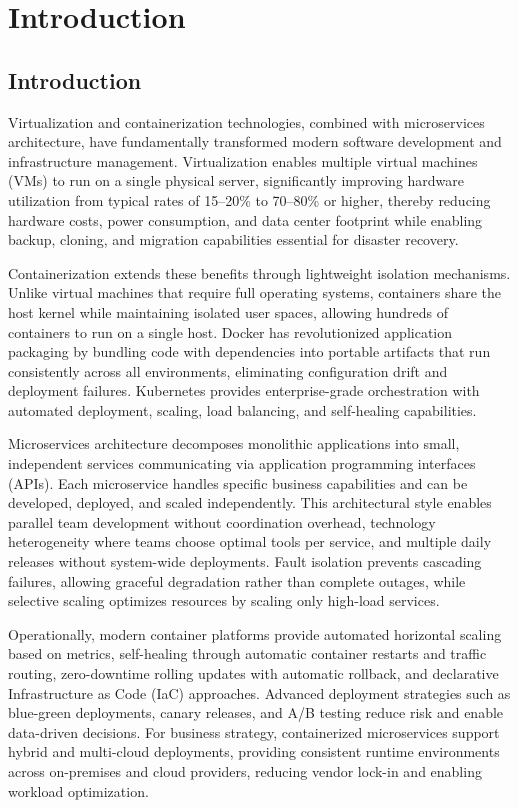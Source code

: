 \documentclass[a4paper, 12pt]{report}
\begin{document}
\chapter{Introduction}

\section{Introduction}

Virtualization and containerization technologies, combined with microservices architecture, have fundamentally transformed modern software development and infrastructure management. Virtualization enables multiple virtual machines (VMs) to run on a single physical server, significantly improving hardware utilization from typical rates of 15–20\% to 70–80\% or higher, thereby reducing hardware costs, power consumption, and data center footprint while enabling backup, cloning, and migration capabilities essential for disaster recovery.

Containerization extends these benefits through lightweight isolation mechanisms. Unlike virtual machines that require full operating systems, containers share the host kernel while maintaining isolated user spaces, allowing hundreds of containers to run on a single host. Docker has revolutionized application packaging by bundling code with dependencies into portable artifacts that run consistently across all environments, eliminating configuration drift and deployment failures. Kubernetes provides enterprise-grade orchestration with automated deployment, scaling, load balancing, and self-healing capabilities.

Microservices architecture decomposes monolithic applications into small, independent services communicating via application programming interfaces (APIs). Each microservice handles specific business capabilities and can be developed, deployed, and scaled independently. This architectural style enables parallel team development without coordination overhead, technology heterogeneity where teams choose optimal tools per service, and multiple daily releases without system-wide deployments. Fault isolation prevents cascading failures, allowing graceful degradation rather than complete outages, while selective scaling optimizes resources by scaling only high-load services.

Operationally, modern container platforms provide automated horizontal scaling based on metrics, self-healing through automatic container restarts and traffic routing, zero-downtime rolling updates with automatic rollback, and declarative Infrastructure as Code (IaC) approaches. Advanced deployment strategies such as blue-green deployments, canary releases, and A/B testing reduce risk and enable data-driven decisions. For business strategy, containerized microservices support hybrid and multi-cloud deployments, providing consistent runtime environments across on-premises and cloud providers, reducing vendor lock-in and enabling workload optimization.
\end{document}
